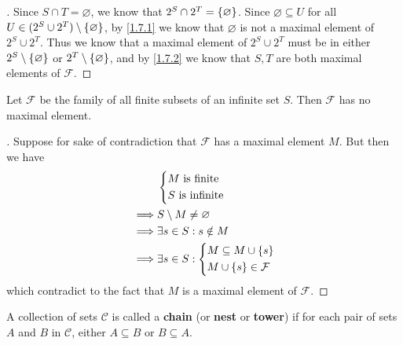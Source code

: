 \begin{proof}[]
  Since \(S \cap T = \varnothing\), we know that \(2^S \cap 2^T = \left\lbrace\varnothing\right\rbrace\).
  Since \(\varnothing \subseteq U\) for all \(U \in (2^S \cup 2^T) \setminus \left\lbrace\varnothing\right\rbrace\), by \cref{1.7.1} we know that \(\varnothing\) is not a maximal element of \(2^S \cup 2^T\).
  Thus we know that a maximal element of \(2^S \cup 2^T\) must be in either \(2^S \setminus \left\lbrace\varnothing\right\rbrace\) or \(2^T \setminus \left\lbrace\varnothing\right\rbrace\), and by \cref{1.7.2} we know that \(S, T\) are both maximal elements of \(\mathcal{F}\).
\end{proof}

\begin{eg}\label{1.7.4}
  Let \(\mathcal{F}\) be the family of all finite subsets of an infinite set \(S\).
  Then \(\mathcal{F}\) has no maximal element.
\end{eg}

\begin{proof}[]
  Suppose for sake of contradiction that \(\mathcal{F}\) has a maximal element \(M\).
  But then we have
  \begin{align*}
             & \begin{dcases}
                 M \text{ is finite} \\
                 S \text{ is infinite}
               \end{dcases}                            \\
    \implies & S \setminus M \neq \varnothing                  \\
    \implies & \exists s \in S : s \notin M                    \\
    \implies & \exists s \in S : \begin{dcases}
                                   M \subseteq M \cup \left\lbrace s\right\rbrace \\
                                   M \cup \left\lbrace s\right\rbrace \in \mathcal{F}
                                 \end{dcases}
  \end{align*}
  which contradict to the fact that \(M\) is a maximal element of \(\mathcal{F}\).
\end{proof}

\begin{defn}\label{1.7.5}
  A collection of sets \(\mathcal{C}\) is called a \textbf{chain} (or \textbf{nest} or \textbf{tower}) if for each pair of sets \(A\) and \(B\) in \(\mathcal{C}\), either \(A \subseteq B\) or \(B \subseteq A\).
\end{defn}

